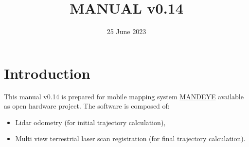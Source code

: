 \documentclass[a4paper,12pt]{book}
\begin{document}
\author{}
\title{MANUAL v0.14}
\date{25 June 2023}

\frontmatter
\maketitle
\tableofcontents

\mainmatter

\chapter{Introduction}
This manual v0.14 is prepared for mobile mapping system \href{https://github.com/JanuszBedkowski/mandeye_controller/blob/main/doc/manual/manual_v0_1/mandeye_dev_manual_v0_1.pdf}{MANDEYE} available as open hardware project.
The software is composed of:
\begin{itemize}
	\item Lidar odometry (for initial trajectory calculation),
	\item Multi view terrestrial laser scan registration (for final trajectory calculation).
\end{itemize}








\backmatter
\end{document}
